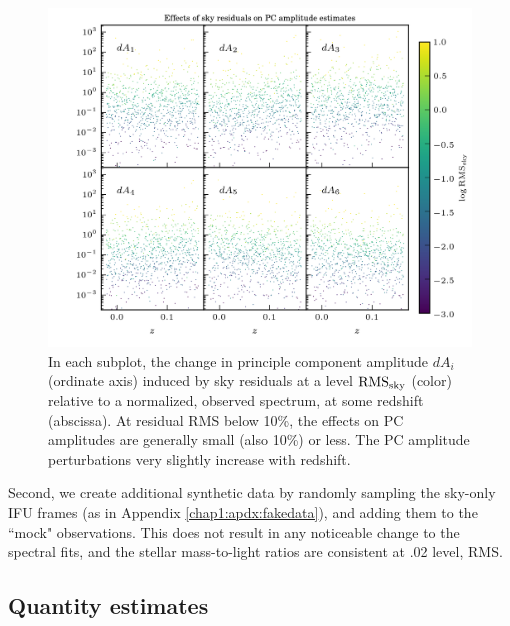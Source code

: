 \begin{figure}
    \centering
    \includegraphics[width=\textwidth]{sky_resids}
    \caption[Effects of imperfect sky subtraction on PC down-projection]{\fixspacing In each subplot, the change in principle component amplitude $dA_i$ (ordinate axis) induced by sky residuals at a level ${\rm RMS_{sky}}$ (color) relative to a normalized, observed spectrum, at some redshift (abscissa). At residual RMS below 10\%, the effects on PC amplitudes are generally small (also 10\%) or less. The PC amplitude perturbations very slightly increase with redshift.}
    \label{fig:sky_resid}
\end{figure}

Second, we create additional synthetic data by randomly sampling the sky-only IFU frames (as in Appendix \ref{chap1:apdx:fakedata}), and adding them to the ``mock" observations. This does not result in any noticeable change to the spectral fits, and the stellar mass-to-light ratios are consistent at .02 level, RMS.

\subsection{Quantity estimates}
\label{chap1:subsec:param_estimates}

